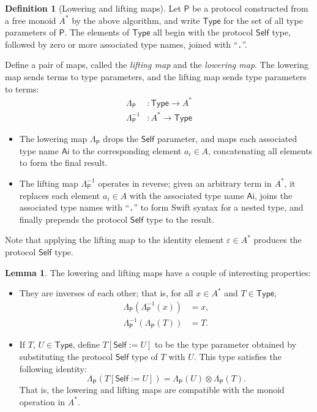 \documentclass[a4paper,headsepline,bibliography=totoc,toc=flat,fleqn,twoside=semi]{scrbook}
\theoremstyle{definition}
\newtheorem{definition}{Definition}[chapter]
\theoremstyle{definition}
\theoremstyle{definition}
\newtheorem{lemma}{Lemma}[chapter]
\newcommand{\namesym}[1]{\mathsf{#1}}
\newcommand{\genericparam}[1]{\bm{\mathsf{#1}}}
\newcommand{\proto}[1]{\bm{\mathsf{#1}}}
\begin{document}
\begin{definition}[Lowering and lifting maps]\label{liftingloweringmaps}
Let $\proto{P}$ be a protocol constructed from a free monoid $A^*$ by the above algorithm, and write $\mathsf{Type}$ for the set of all type parameters of $\proto{P}$. The elements of $\mathsf{Type}$ all begin with the protocol $\genericparam{Self}$ type, followed by zero or more associated type names, joined with ``\texttt{.}''.

Define a pair of maps, called the \emph{lifting map} and the \emph{lowering map}. The lowering map sends terms to type parameters, and the lifting map sends type parameters to terms:
\begin{align*}
\Lambda_{\proto{P}}&\colon \mathsf{Type}\rightarrow A^*\\
\Lambda^{-1}_{\proto{P}}&\colon A^*\rightarrow\mathsf{Type}
\end{align*}
\index{protocol $\genericparam{Self}$ type}
\begin{itemize}
\item The lowering map $\Lambda_{\proto{P}}$ drops the $\genericparam{Self}$ parameter, and maps each associated type name $\namesym{Ai}$ to the corresponding element $a_i\in A$, concatenating all elements to form the final result.
\item The lifting map $\Lambda^{-1}_{\proto{P}}$ operates in reverse; given an arbitrary term in $A^*$, it replaces each element $a_i\in A$ with the associated type name $\namesym{Ai}$, joins the associated type names with ``\texttt{.}'' to form Swift syntax for a nested type, and finally prepends the protocol $\genericparam{Self}$ type to the result.
\end{itemize}
Note that applying the lifting map to the identity element $\varepsilon\in A^*$ produces the protocol $\genericparam{Self}$ type.
\end{definition}
\begin{lemma}
The lowering and lifting maps have a couple of interesting properties:
\begin{itemize}
\item They are inverses of each other; that is, for all $x\in A^*$ and $T\in\mathsf{Type}$,
\begin{align*}
\Lambda_{\proto{P}}(\Lambda_{\proto{P}}^{-1}(x))&=x,\\
\Lambda_{\proto{P}}^{-1}(\Lambda_{\proto{P}}(T))&=T.
\end{align*}
\item If $T$, $U\in\mathsf{Type}$, define $T[\genericparam{Self}:=U]$ to be the type parameter obtained by substituting the protocol $\genericparam{Self}$ type of $T$ with $U$. This type satisfies the following identity:
\[\Lambda_{\proto{P}}(T[\genericparam{Self}:=U]) = \Lambda_{\proto{P}}(U)\otimes \Lambda_{\proto{P}}(T).\]
That is, the lowering and lifting maps are compatible with the monoid operation in $A^*$.
\end{itemize}
\end{lemma}
\end{document}
